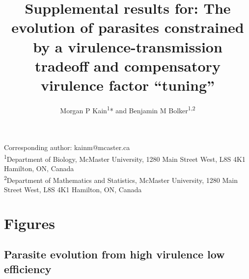 \documentclass{article}
\title{Supplemental results for: The evolution of parasites constrained by a virulence-transmission tradeoff and compensatory virulence factor ``tuning''}
\author{Morgan P Kain\textsuperscript{1}* and Benjamin M Bolker\textsuperscript{1,2}}
\date{}
\begin{document}
\maketitle

\noindent *Corresponding author: kainm@mcaster.ca \\
\textsuperscript{1}Department of Biology, McMaster University, 1280 Main Street West, L8S 4K1 Hamilton, ON, Canada \\
\textsuperscript{2}Department of Mathematics and Statistics, McMaster University, 1280 Main Street West, L8S 4K1 Hamilton, ON, Canada \\

\clearpage

\setcounter{table}{0}
\renewcommand{\thetable}{S\arabic{table}}
\setcounter{section}{3}

\setcounter{figure}{0}
\renewcommand{\thefigure}{S\arabic{figure}}
\setcounter{section}{3}

\section*{Figures}

\subsection*{Parasite evolution from high virulence low efficiency}
\end{document}
